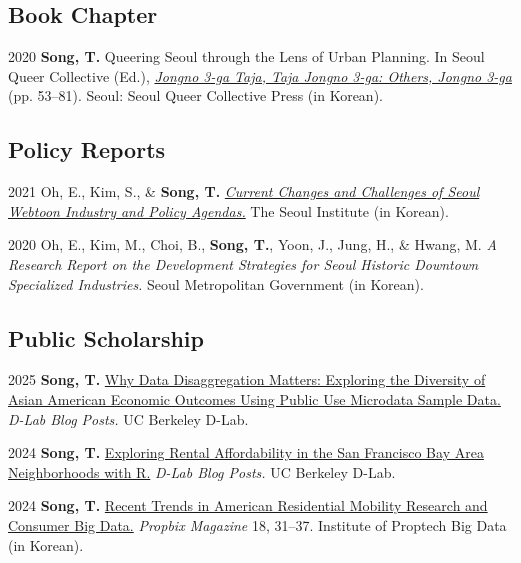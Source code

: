 \documentclass[11pt,letterpaper]{article}
\begin{document}
\subsection{Book Chapter}
\begin{tablist}
  \item[2020] \tab{}\textbf{Song, T.} Queering Seoul through the Lens of Urban Planning. In Seoul Queer Collective (Ed.), \emph{\href{http://www.kyobobook.co.kr/product/detailViewKor.laf?ejkGb=KOR&mallGb=KOR&barcode=9791197096501}{Jongno 3-ga Taja, Taja Jongno 3-ga: Others, Jongno 3-ga}} (pp. 53–81). Seoul: Seoul Queer Collective Press (in Korean).
\end{tablist}

\subsection{Policy Reports}
\begin{tablist}
  \item[2021] \tab{}Oh, E., Kim, S., \& \textbf{Song, T.} \emph{\href{https://www.si.re.kr/bbs/view.do?key=2024100039&pstSn=2111190001}{Current Changes and Challenges of Seoul Webtoon Industry and Policy Agendas.}} The Seoul Institute (in Korean).
  \item[2020] \tab{}Oh, E., Kim, M., Choi, B., \textbf{Song, T.}, Yoon, J., Jung, H., \& Hwang, M. \emph{A Research Report on the Development Strategies for Seoul Historic Downtown Specialized Industries.} Seoul Metropolitan Government (in Korean).
\end{tablist}

\subsection{Public Scholarship}
\begin{tablist}
  \item[2025] \tab{}\textbf{Song, T.} \href{https://medium.com/@dlab-berkeley/why-data-disaggregation-matters-exploring-the-diversity-of-asian-american-economic-outcomes-using-8b96e5dcc9a4}{Why Data Disaggregation Matters: Exploring the Diversity of Asian American Economic Outcomes Using Public Use Microdata Sample Data.} \emph{D-Lab Blog Posts.} UC Berkeley D-Lab.
  \item[2024] \tab{}\textbf{Song, T.} \href{https://medium.com/@dlab-berkeley/exploring-rental-affordability-in-the-san-francisco-bay-area-neighborhoods-with-r-c4383f7553e7}{Exploring Rental Affordability in the San Francisco Bay Area Neighborhoods with R.} \emph{D-Lab Blog Posts.} UC Berkeley D-Lab.
  \item[2024] \tab{}\textbf{Song, T.} \href{https://www.kahps.org/data/prbx/pdf_44_7}{Recent Trends in American Residential Mobility Research and Consumer Big Data.} \emph{Propbix Magazine} 18, 31–37. Institute of Proptech Big Data (in Korean).
\end{tablist}
\end{document}
